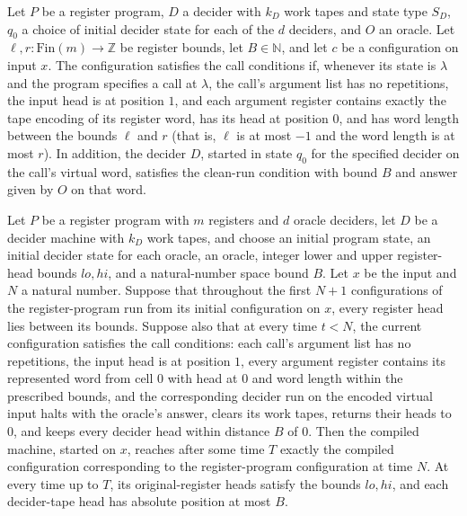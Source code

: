 \begin{definition}
\label{Complexity.LogProg.CallOK}
\leanok
{}
Let $P$ be a register program, $D$ a decider with $k_D$ work tapes and state type $S_D$,
$q_0$ a choice of initial decider state for each of the $d$ deciders, and $O$ an oracle.
Let $\ell,r\colon\mathrm{Fin}(m)\to\mathbb{Z}$ be register bounds, let $B\in\mathbb{N}$,
and let $c$ be a configuration on input $x$. The configuration satisfies the call
conditions if, whenever its state is $\lambda$ and the program specifies a call at
$\lambda$, the call's argument list has no repetitions, the input head is at position
$1$, and each argument register contains exactly the tape encoding of its register word,
has its head at position $0$, and has word length between the bounds $\ell$ and $r$
(that is, $\ell$ is at most $-1$ and the word length is at most $r$). In addition, the
decider $D$, started in state $q_0$ for the specified decider on the call's virtual
word, satisfies the clean-run condition with bound $B$ and answer given by $O$ on that
word.
\end{definition}

\begin{theorem}
\label{Complexity.LogProg.compile_correct}
\leanok
{}
Let $P$ be a register program with $m$ registers and $d$ oracle deciders, let $D$ be a
decider machine with $k_D$ work tapes, and choose an initial program state, an initial
decider state for each oracle, an oracle, integer lower and upper register-head bounds
$lo,hi$, and a natural-number space bound $B$. Let $x$ be the input and $N$ a natural
number. Suppose that throughout the first $N+1$ configurations of the register-program
run from its initial configuration on $x$, every register head lies between its bounds.
Suppose also that at every time $t<N$, the current configuration satisfies the call
conditions: each call's argument list has no repetitions, the input head is at position
$1$, every argument register contains its represented word from cell $0$ with head at
$0$ and word length within the prescribed bounds, and the corresponding decider run on
the encoded virtual input halts with the oracle's answer, clears its work tapes, returns
their heads to $0$, and keeps every decider head within distance $B$ of $0$. Then the
compiled machine, started on $x$, reaches after some time $T$ exactly the compiled
configuration corresponding to the register-program configuration at time $N$. At every
time up to $T$, its original-register heads satisfy the bounds $lo,hi$, and each
decider-tape head has absolute position at most $B$.
\end{theorem}

